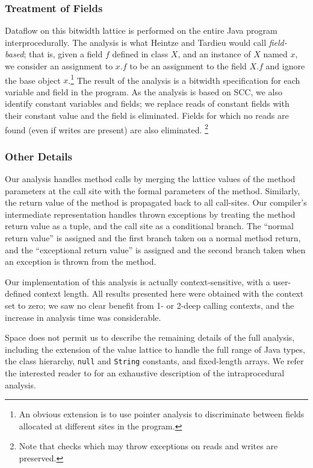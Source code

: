 \documentclass{sig-alt-full}
\begin{document}
\subsubsection{Treatment of Fields}
Dataflow on this bitwidth lattice is performed on the entire Java
program interprocedurally.  The analysis is what Heintze and Tardieu
\cite{heintze01}
would call {\it field-based}; that is, given a field $f$ defined in
class $X$, and an instance of $X$ named $x$, we consider an assignment
to $x.f$ to be an assignment to the field $X.f$ and ignore the base
object $x$.\footnote{An obvious extension is to use pointer
analysis to discriminate between fields allocated at different sites
in the program.}  The result of the analysis is a bitwidth
specification for each variable and field in the program.  As the
analysis is based on SCC, we also identify constant variables and
fields; we replace reads of constant fields with their constant
value and the field is eliminated.  Fields for which no reads are
found (even if writes are present) are also eliminated.%
\footnote{Note that checks which may throw exceptions on reads and
  writes are preserved.}

\subsubsection{Other Details}
Our analysis handles method calls by merging the lattice values of the
method parameters at the call site with the formal parameters of the
method.  Similarly, the return value of the method is propagated back
to all call-sites.  Our compiler's intermediate representation handles
thrown exceptions by treating the method return value as a tuple, and
the call site as a conditional branch.  The ``normal return value'' is
assigned and the first branch taken on a normal method return, and the
``exceptional return value'' is assigned and the second branch taken when an
exception is thrown from the method.

Our implementation of this analysis is actually context-sensitive,
with a user-defined context length.  All results presented here were
obtained with the context set to zero; we saw no clear benefit from 1-
or 2-deep calling contexts, and the increase in analysis
time was considerable.

Space does not permit us to describe the remaining details of the full
analysis, including the extension of the value
lattice to handle the full range of Java types, the class hierarchy,
{\tt null} and {\tt String} constants, and fixed-length arrays.
We refer the interested reader to \cite{ananian99:tech} for an
exhaustive description of the intraprocedural analysis.
\end{document}
